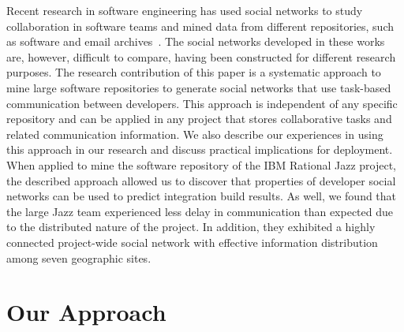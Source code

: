 \documentclass[12pt,oneside]{book}
\newcommand{\jazztm}{Jazz}
\begin{document}
Recent research in software engineering has used social networks to study
collaboration in software teams and mined data from different repositories, such
as software and email
archives~\cite{bird:msr:2006,herbsleb:2008fse,ehrlich2008:gaps}. The social networks
developed in these works are, however, difficult to compare, having been
constructed for different research purposes. The research contribution of this
paper is a systematic approach to mine large software repositories to generate
social networks that use task-based communication between developers. This
approach is independent of any specific repository and can be applied in any
project that stores collaborative tasks and related communication information. We
also describe our experiences in using this approach in our research and discuss
practical implications for deployment. When applied to mine the software
repository of the IBM Rational Jazz project, the described approach allowed us to
discover that properties of developer social networks can be used to predict
integration build results. As well, we found that the large Jazz team experienced
less delay in communication than expected due to the distributed nature of the
project. In addition, they exhibited a highly connected project-wide social
network with effective information distribution among seven geographic sites.







\section{Our Approach} 

\end{document}
